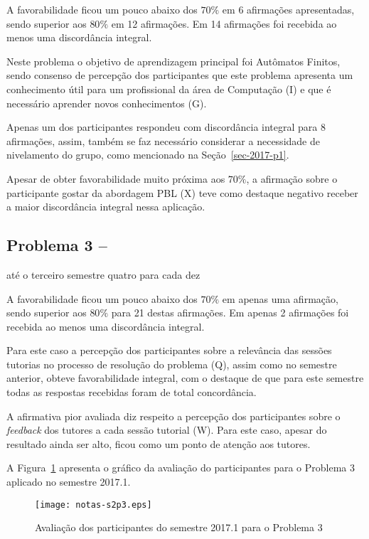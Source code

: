 A favorabilidade ficou um pouco abaixo dos $70\%$ em 6 afirmações apresentadas,
sendo superior aos $80\%$ em 12 afirmações.
Em 14 afirmações foi recebida ao menos uma discordância integral.

Neste problema o objetivo de aprendizagem principal foi
Autômatos Finitos, sendo consenso de percepção dos participantes que
este problema apresenta um conhecimento útil para um profissional
da área de Computação (I) e que é necessário aprender novos
conhecimentos (G).

Apenas um dos participantes respondeu com discordância integral para
8 afirmações, assim, também se faz necessário considerar a
necessidade de nivelamento do grupo, como mencionado
na Seção~\ref{sec-2017-p1}.

Apesar de obter favorabilidade muito próxima aos $70\%$, a afirmação
sobre o participante gostar da abordagem PBL (X) teve como
destaque negativo receber a maior discordância integral nessa
aplicação.


\subsection{Problema 3 -- \ProblemaC}
{até o terceiro semestre}{ quatro para cada dez}

A favorabilidade ficou um pouco abaixo dos $70\%$ em apenas uma afirmação,
sendo superior aos $80\%$ para 21 destas afirmações.
Em apenas 2 afirmações foi recebida ao menos uma discordância integral.

Para este caso a percepção dos participantes
sobre a relevância das sessões tutorias no processo
de resolução do problema (Q), assim como no semestre
anterior, obteve favorabilidade integral, com o destaque de
que para este semestre todas as respostas recebidas foram de
total concordância.

A afirmativa pior avaliada diz respeito a percepção dos participantes
sobre o \textit{feedback} dos tutores a cada sessão tutorial (W).
Para este caso, apesar do resultado ainda ser alto, ficou como
um ponto de atenção aos tutores.

A Figura~\ref{aval-s2p3} apresenta o gráfico da
avaliação do participantes para o Problema 3 aplicado no semestre 2017.1.

\begin{figure}[!htb]
\centering
\texttt{[image: notas-s2p3.eps]}
\caption{Avaliação dos participantes do semestre 2017.1 para o Problema 3}
\label{aval-s2p3}
\end{figure}

